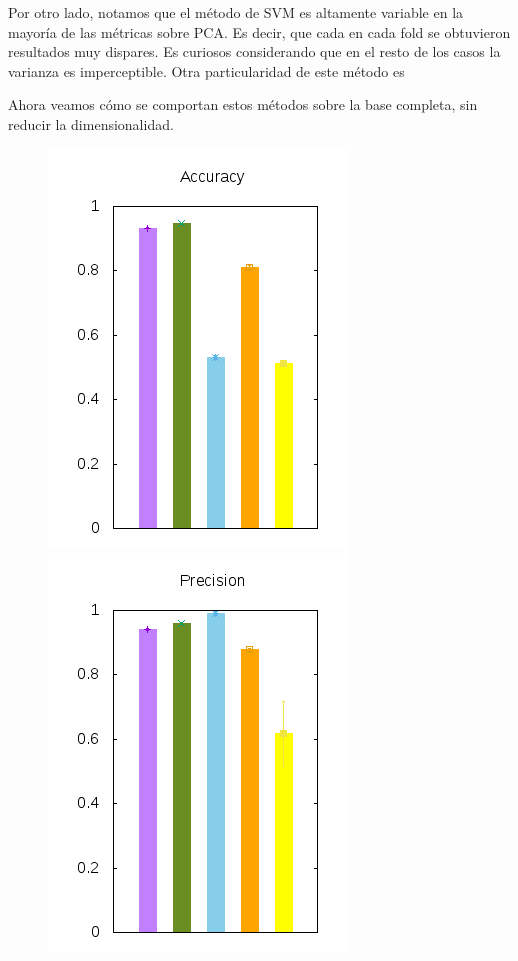 \documentclass[10pt, a4paper]{article}
\begin{document}
Por otro lado, notamos que el método de SVM es altamente variable en la mayoría de las métricas sobre PCA. Es decir, que cada en cada fold se obtuvieron resultados muy dispares. Es curiosos considerando que en el resto de los casos la varianza es imperceptible. Otra particularidad de este método es

Ahora veamos cómo se comportan estos métodos sobre la base completa, sin reducir la dimensionalidad.

\begin{figure}[H]
  \begin{minipage}{1\textwidth}
	\includegraphics[scale=0.5]{../src/data/ac.png}
	\includegraphics[scale=0.5]{../src/data/pr.png}

\end{minipage}
\end{figure}
\end{document}
